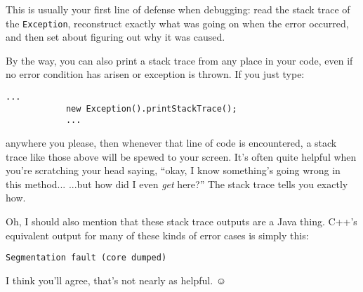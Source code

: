 This is usually your first line of defense when debugging: read the stack
trace of the \texttt{Exception}, reconstruct exactly what was going on when
the error occurred, and then set about figuring out why it was caused.

By the way, you can also print a stack trace from any place in your code, even
if no error condition has arisen or exception is thrown. If you just type:

\begin{Verbatim}[fontsize=\small,samepage=true,frame=single]
            ...
            new Exception().printStackTrace();
            ...
\end{Verbatim}

anywhere you please, then whenever that line of code is encountered, a stack
trace like those above will be spewed to your screen. It's often quite helpful
when you're scratching your head saying, ``okay, I know something's going wrong
in this method... ...but how did I even \textit{get} here?'' The stack trace
tells you exactly how.

\bigskip
{}
Oh, I should also mention that these stack trace outputs are a Java thing.
C++'s equivalent output for many of these kinds of error cases is simply this:

\begin{Verbatim}[fontsize=\small,samepage=true,frame=none]
Segmentation fault (core dumped)
\end{Verbatim}

I think you'll agree, that's not nearly as helpful. $\smiley$
